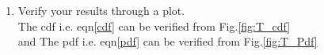 \documentclass[journal,12pt,twocolumn]{IEEEtran}
\renewcommand\thesection{\arabic{section}}
\begin{document}
\begin{enumerate}[label=\thesection.\arabic*
,ref=\thesection.\theenumi]
\begin{itemize}
\end{itemize}
Now the theoretical expression of cdf of $T$
\begin{align}
    F_T(t) &= \int_{0}^{t}f_T(t)dx\\
    &=\begin{cases}
        \int_{0}^{t} dt &0<t<1 \\
        \int_{0}^{t} (2-t)dt &1<t<2 \\
        \int_{0}^{2} (2-t)dt &t>2
    \end{cases} \\ \label{cdf}
    &=\begin{cases}
        0 & t<0 \\
        \frac{t^2}{2} &0<t<1\\
        2t - \frac{t^2}{2} & 1<t<2\\
        1 & t>2
    \end{cases}
\end{align}
\item Verify your results through a plot. \\
\solution The cdf i.e. eqn\ref{cdf} can be verified from Fig.\ref{fig:T_cdf}\\
and The pdf i.e. eqn\ref{pdf} can be verified from Fig.\ref{fig:T_Pdf}

\end{enumerate}
\end{document}

